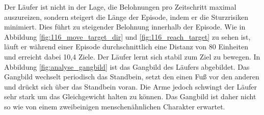 Der Läufer ist nicht in der Lage, die Belohnungen pro Zeitschritt maximal auszureizen, sondern steigert die Länge der Episode, indem er die Sturzrisiken minimiert. Dies führt zu steigender Belohnung innerhalb der Episode. Wie in Abbildung \ref{fig:116_move_target_dir} und \ref{fig:116_reach_target} zu sehen ist, läuft er während einer Episode durchschnittlich eine Distanz von 80 Einheiten und erreicht dabei 10,4 Ziele. Der Läufer lernt sich stabil zum Ziel zu bewegen. In Abbildung \ref{fig:analyse_gangbild} ist das Gangbild des Läufers abgebildet. Das Gangbild wechselt periodisch das Standbein, setzt den einen Fuß vor den anderen und drückt sich über das Standbein voran. Die Arme jedoch schwingt der Läufer sehr stark um das Gleichgewicht halten zu können. Das Gangbild ist daher nicht so wie von einem zweibeinigen menschenähnlichen Charakter erwartet.


